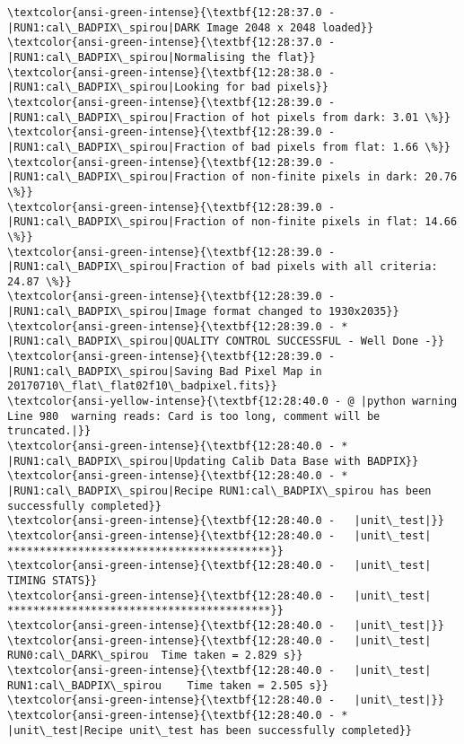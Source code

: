 \documentclass[11pt]{article}
\begin{document}
\begin{Verbatim}[commandchars=\\\{\}]
\textcolor{ansi-green-intense}{\textbf{12:28:37.0 -   |RUN1:cal\_BADPIX\_spirou|DARK Image 2048 x 2048 loaded}}
\textcolor{ansi-green-intense}{\textbf{12:28:37.0 -   |RUN1:cal\_BADPIX\_spirou|Normalising the flat}}
\textcolor{ansi-green-intense}{\textbf{12:28:38.0 -   |RUN1:cal\_BADPIX\_spirou|Looking for bad pixels}}
\textcolor{ansi-green-intense}{\textbf{12:28:39.0 -   |RUN1:cal\_BADPIX\_spirou|Fraction of hot pixels from dark: 3.01 \%}}
\textcolor{ansi-green-intense}{\textbf{12:28:39.0 -   |RUN1:cal\_BADPIX\_spirou|Fraction of bad pixels from flat: 1.66 \%}}
\textcolor{ansi-green-intense}{\textbf{12:28:39.0 -   |RUN1:cal\_BADPIX\_spirou|Fraction of non-finite pixels in dark: 20.76 \%}}
\textcolor{ansi-green-intense}{\textbf{12:28:39.0 -   |RUN1:cal\_BADPIX\_spirou|Fraction of non-finite pixels in flat: 14.66 \%}}
\textcolor{ansi-green-intense}{\textbf{12:28:39.0 -   |RUN1:cal\_BADPIX\_spirou|Fraction of bad pixels with all criteria: 24.87 \%}}
\textcolor{ansi-green-intense}{\textbf{12:28:39.0 -   |RUN1:cal\_BADPIX\_spirou|Image format changed to 1930x2035}}
\textcolor{ansi-green-intense}{\textbf{12:28:39.0 - * |RUN1:cal\_BADPIX\_spirou|QUALITY CONTROL SUCCESSFUL - Well Done -}}
\textcolor{ansi-green-intense}{\textbf{12:28:39.0 -   |RUN1:cal\_BADPIX\_spirou|Saving Bad Pixel Map in 20170710\_flat\_flat02f10\_badpixel.fits}}
\textcolor{ansi-yellow-intense}{\textbf{12:28:40.0 - @ |python warning Line 980  warning reads: Card is too long, comment will be truncated.|}}
\textcolor{ansi-green-intense}{\textbf{12:28:40.0 - * |RUN1:cal\_BADPIX\_spirou|Updating Calib Data Base with BADPIX}}
\textcolor{ansi-green-intense}{\textbf{12:28:40.0 - * |RUN1:cal\_BADPIX\_spirou|Recipe RUN1:cal\_BADPIX\_spirou has been successfully completed}}
\textcolor{ansi-green-intense}{\textbf{12:28:40.0 -   |unit\_test|}}
\textcolor{ansi-green-intense}{\textbf{12:28:40.0 -   |unit\_test| *****************************************}}
\textcolor{ansi-green-intense}{\textbf{12:28:40.0 -   |unit\_test| TIMING STATS}}
\textcolor{ansi-green-intense}{\textbf{12:28:40.0 -   |unit\_test| *****************************************}}
\textcolor{ansi-green-intense}{\textbf{12:28:40.0 -   |unit\_test|}}
\textcolor{ansi-green-intense}{\textbf{12:28:40.0 -   |unit\_test|	RUN0:cal\_DARK\_spirou	Time taken = 2.829 s}}
\textcolor{ansi-green-intense}{\textbf{12:28:40.0 -   |unit\_test|	RUN1:cal\_BADPIX\_spirou	Time taken = 2.505 s}}
\textcolor{ansi-green-intense}{\textbf{12:28:40.0 -   |unit\_test|}}
\textcolor{ansi-green-intense}{\textbf{12:28:40.0 - * |unit\_test|Recipe unit\_test has been successfully completed}}

    \end{Verbatim}


    
    
    
    
\end{document}
